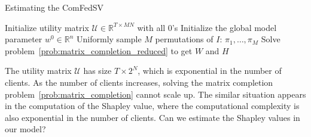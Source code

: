\begin{algorithm}[t]
    \DontPrintSemicolon
    \caption{Estimating the ComFedSV} \label{alg:main}
    Initialize utility matrix $\mathcal{U} \in \mathbb{R}^{T\times MN}$ with all $0$'s\;
    Initialize the global model parameter $w^0 \in \mathbb{R}^n$\;
    Uniformly sample $M$ permutations of $I$: $\pi_1, \dots, \pi_M$\;
     Solve problem~\eqref{prob:matrix_completion_reduced} to get $W$ and $H$\;
\end{algorithm}

The utility matrix $\mathcal{U}$ has size $T \times 2^N$, which is exponential in the number of clients. As the number of clients increases, solving the matrix completion problem~\eqref{prob:matrix_completion} cannot scale up. The similar situation appears in the computation of the Shapley value, where the computational complexity is also exponential in the number of clients. Can we estimate the Shapley values in our model?

